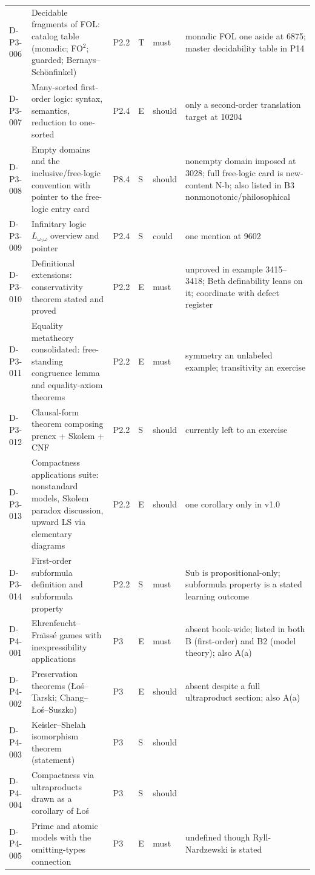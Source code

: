 \begin{longtable}{@{}p{0.62in}p{2.6in}p{0.75in}p{0.22in}p{0.42in}p{1.85in}@{}}
D-P3-006 & Decidable fragments of FOL: catalog table (monadic; FO\(^2\); guarded; Bernays--Sch\"onfinkel) & P2.2 & T & must & monadic FOL one aside at 6875; master decidability table in P14 \\
D-P3-007 & Many-sorted first-order logic: syntax, semantics, reduction to one-sorted & P2.4 & E & should & only a second-order translation target at 10204 \\
D-P3-008 & Empty domains and the inclusive/free-logic convention with pointer to the free-logic entry card & P8.4 & S & should & nonempty domain imposed at 3028; full free-logic card is new-content N-b; also listed in B3 nonmonotonic/philosophical \\
D-P3-009 & Infinitary logic \(L_{\omega_1\omega}\) overview and pointer & P2.4 & S & could & one mention at 9602 \\
D-P3-010 & Definitional extensions: conservativity theorem stated and proved & P2.2 & E & must & unproved in example 3415--3418; Beth definability leans on it; coordinate with defect register \\
D-P3-011 & Equality metatheory consolidated: free-standing congruence lemma and equality-axiom theorems & P2.2 & E & must & symmetry an unlabeled example; transitivity an exercise \\
D-P3-012 & Clausal-form theorem composing prenex + Skolem + CNF & P2.2 & S & should & currently left to an exercise \\
D-P3-013 & Compactness applications suite: nonstandard models, Skolem paradox discussion, upward LS via elementary diagrams & P2.2 & E & should & one corollary only in v1.0 \\
D-P3-014 & First-order subformula definition and subformula property & P2.2 & S & must & Sub is propositional-only; subformula property is a stated learning outcome \\
D-P4-001 & Ehrenfeucht--Fra\"{\i}ss\'e games with inexpressibility applications & P3 & E & must & absent book-wide; listed in both B (first-order) and B2 (model theory); also A(a) \\
D-P4-002 & Preservation theorems ({\L}o\'s--Tarski; Chang--{\L}o\'s--Suszko) & P3 & E & should & absent despite a full ultraproduct section; also A(a) \\
D-P4-003 & Keisler--Shelah isomorphism theorem (statement) & P3 & S & should &  \\
D-P4-004 & Compactness via ultraproducts drawn as a corollary of {\L}o\'s & P3 & S & should &  \\
D-P4-005 & Prime and atomic models with the omitting-types connection & P3 & E & must & undefined though Ryll-Nardzewski is stated \\

\end{longtable}

